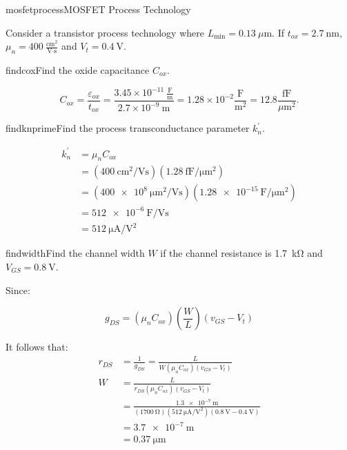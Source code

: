 \begin{mainquestion}{mosfetprocess}{MOSFET Process Technology}

Consider a transistor process technology where $L_{\text{min}} = 0.13\ \mu\text{m}$. If $t_{ox} = 2.7\ \text{nm}$, $\mu_{n} = 400\ \frac{\text{cm}^{2}}{\text{V}\cdot\text{s}}$ and $V_{t} = \qty{0.4}{\volt}$.

\begin{partquestion}{findcox}{Find the oxide capacitance $C_{ox}$.}
\begin{answer}
\[
C_{ox} = \frac{\varepsilon_{ox}}{t_{ox}} = \frac{3.45 \times 10^{-11}\ \frac{\text{F}}{\text{m}}}{2.7 \times 10^{-9}\ \text{m}} = 1.28 \times 10^{-2} \frac{\text{F}}{\text{m}^{2}} = 12.8 \frac{\text{fF}}{\mu\text{m}^{2}}.
\]
\end{answer}
\end{partquestion}

\begin{partquestion}{findknprime}{Find the process transconductance parameter $k_{n}^{\prime}$.}
\begin{answer}
\begin{align*}
    k_{n}^{\prime} &= \mu_{n}C_{ox}\\
    &= (\qty{400}{\centi\meter^2/\volt\second})(\qty{1.28}{\femto\farad/\micro\meter^2}) \\
    &= (\qty{400e8}{\micro\meter^2/\volt\second})(\qty{1.28e-15}{\farad/\micro\meter^2}) \\
    &= \qty{512e-6}{\farad/\volt\second} \\
    &= \qty{512}{\unit{\micro\ampere}/\unit{\volt}^2}
\end{align*}
\end{answer}
\end{partquestion}

\begin{partquestion}{findwidth}{Find the channel width $W$ if the channel resistance is \qty{1.7}{\kilo\ohm} and $V_{GS} = \qty{0.8}{\volt}$.}
\begin{answer}
Since:

\[
g_{DS} = (\mu_{n} C_{ox})\left(\frac{W}{L}\right)(v_{GS} - V_{t})
\]

It follows that:
\begin{align*}
    r_{DS} &= \frac{1}{g_{DS}} = \frac{L}{W(\mu_n C_{ox})(v_{GS} - V_t)} \\
    W &= \frac{L}{r_{DS} (\mu_n C_{ox})(v_{GS} - V_t)} \\
    &= \frac{\qty{1.3e-7}{\meter}}{(\qty{1700}{\ohm}) (\qty{512}{\unit{\micro\ampere}/\unit{\volt}^2})(\qty{0.8}{\volt} - \qty{0.4}{\volt})} \\
    &= \qty{3.7e-7}{\meter} \\
    &= \qty{0.37}{\micro\meter}
\end{align*}
\end{answer}
\end{partquestion}


\end{mainquestion}
